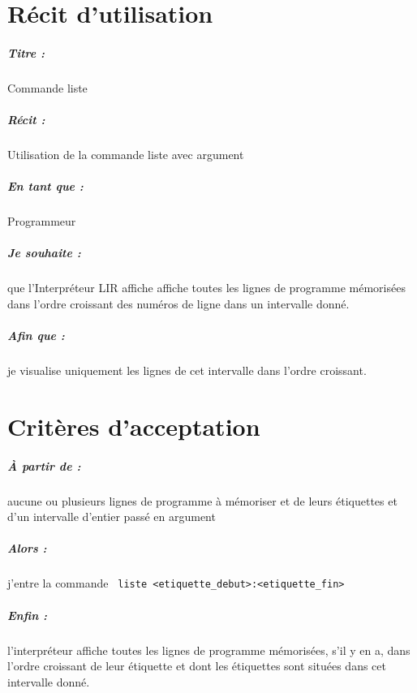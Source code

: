 \documentclass[12pt,a5paper, notitle, oneside]{report}
\begin{document}
    \chapter*{Récit d'utilisation}

    \paragraph{Titre : } Commande liste
    \paragraph{Récit : } Utilisation de la commande liste avec argument
    \paragraph{En tant que : } Programmeur
    \paragraph{Je souhaite : } que l'Interpréteur LIR affiche affiche
    toutes les lignes de programme mémorisées dans l'ordre
    croissant des numéros de ligne dans un intervalle donné.
    \paragraph{Afin que : } je visualise uniquement les lignes de cet intervalle dans l'ordre croissant.
    \newpage

    \chapter*{Critères d'acceptation}

    \paragraph{À partir de : } aucune ou plusieurs lignes de programme
    à mémoriser et de leurs étiquettes et d'un intervalle d'entier passé en argument

    \paragraph{Alors : } j'entre la commande \verb| liste <etiquette_debut>:<etiquette_fin> |

    \paragraph{Enfin : } l'interpréteur affiche toutes les lignes
    de programme mémorisées, s'il y en a, dans l'ordre croissant de leur
    étiquette et dont les étiquettes sont situées dans cet intervalle donné.
\end{document}
